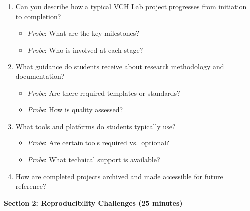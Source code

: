 \documentclass[
  oneside,
  open=any]{scrbook}
\providecommand{\tightlist}{%
  \setlength{\itemsep}{0pt}\setlength{\parskip}{0pt}}\usepackage{longtable,booktabs,array}
\begin{document}
\begin{enumerate}
\def\labelenumi{\arabic{enumi}.}
\tightlist
\item
  Can you describe how a typical VCH Lab project progresses from
  initiation to completion?

  \begin{itemize}
  \tightlist
  \item
    \emph{Probe}: What are the key milestones?
  \item
    \emph{Probe}: Who is involved at each stage?
  \end{itemize}
\item
  What guidance do students receive about research methodology and
  documentation?

  \begin{itemize}
  \tightlist
  \item
    \emph{Probe}: Are there required templates or standards?
  \item
    \emph{Probe}: How is quality assessed?
  \end{itemize}
\item
  What tools and platforms do students typically use?

  \begin{itemize}
  \tightlist
  \item
    \emph{Probe}: Are certain tools required vs.~optional?
  \item
    \emph{Probe}: What technical support is available?
  \end{itemize}
\item
  How are completed projects archived and made accessible for future
  reference?
\end{enumerate}

\textbf{Section 2: Reproducibility Challenges (25 minutes)}
\end{document}
